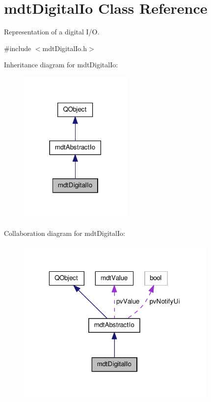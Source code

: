 \hypertarget{classmdt_digital_io}{\section{mdt\-Digital\-Io Class Reference}
\label{classmdt_digital_io}
}


Representation of a digital I/\-O.  




{\ttfamily \#include $<$mdt\-Digital\-Io.\-h$>$}



Inheritance diagram for mdt\-Digital\-Io\-:\nopagebreak
\begin{figure}[H]
\begin{center}
\leavevmode
\includegraphics[width=158pt]{classmdt_digital_io__inherit__graph}
\end{center}
\end{figure}


Collaboration diagram for mdt\-Digital\-Io\-:\nopagebreak
\begin{figure}[H]
\begin{center}
\leavevmode
\includegraphics[width=280pt]{classmdt_digital_io__coll__graph}
\end{center}
\end{figure}
